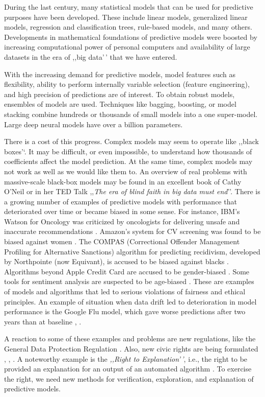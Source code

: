 \documentclass[12pt,]{krantz}
\begin{document}
During the last century, many statistical models that can be used for predictive purposes have been developed. These include linear models, generalized linear models, regression and classification trees, rule-based models, and many others. Developments in mathematical foundations of predictive models were boosted by increasing computational power of personal computers and availability of large datasets in the era of ,,big data'\,' that we have entered.

With the increasing demand for predictive models, model features such as flexibility, ability to perform internally variable selection (feature engineering), and high precision of predictions are of interest. To obtain robust models, ensembles of models are used. Techniques like bagging, boosting, or model stacking combine hundreds or thousands of small models into a one super-model. Large deep neural models have over a billion parameters.

There is a cost of this progress. Complex models may seem to operate like ,,black boxes'`. It may be difficult, or even impossible, to understand how thousands of coefficients affect the model prediction. At the same time, complex models may not work as well as we would like them to. An overview of real problems with massive-scale black-box models may be found in an excellent book of Cathy O'Neil \citep{ONeil} or in her TED Talk ,,\emph{The era of blind faith in big data must end}''. There is a growing number of examples of predictive models with performance that deteriorated over time or became biased in some sense. For instance, IBM's Watson for Oncology was criticized by oncologists for delivering unsafe and inaccurate recommendations \citep{IBMWatson}. Amazon's system for CV screening was found to be biased against women \citep{AmazonAI}. The COMPAS (Correctional Offender Management Profiling for Alternative Sanctions) algorithm for predicting recidivism, developed by Northpointe (now Equivant), is accused to be biased against blacks \citep{COMPAS}. Algorithms beyond Apple Credit Card are accused to be gender-biased \citep{AppleCreditCard}. Some tools for sentiment analysis are suspected to be age-biased \citep{Diaz2018}. These are examples of models and algorithms that led to serious violations of fairness and ethical principles. An example of situation when data drift led to deterioration in model performance is the Google Flu model, which gave worse predictions after two years than at baseline \citep{GoogleFLU}, \citep{Lazer1203}.

A reaction to some of these examples and problems are new regulations, like the General Data Protection Regulation \citep{EUGDPR}. Also, new civic rights are being formulated \citep{RightToExpl}, \citep{RightToExpl2}, \citep{RightToExpl3}. A noteworthy example is the \emph{,,Right to Explanation'\,'}, i.e., the right to be provided an explanation for an output of an automated algorithm \citep{RightToExpl}. To exercise the right, we need new methods for verification, exploration, and explanation of predictive models.
\end{document}
